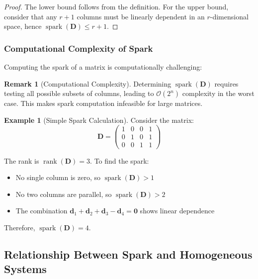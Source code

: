 \documentclass[12pt]{article}
\renewcommand{\vec}[1]{\mathbf{#1}}
\DeclareMathOperator{\spark}{spark}
\DeclareMathOperator{\rank}{rank}
\theoremstyle{definition}
\newtheorem{example}[theorem]{Example}
\newtheorem{remark}[theorem]{Remark}
\begin{document}
\begin{proof}
    The lower bound follows from the definition. For the upper bound, consider that any $r+1$ columns must be linearly dependent in an $r$-dimensional space, hence $\spark(\mathbf{D}) \leq r + 1$.
\end{proof}

\subsubsection{Computational Complexity of Spark}

Computing the spark of a matrix is computationally challenging:

\begin{remark}[Computational Complexity]
    Determining $\spark(\mathbf{D})$ requires testing all possible subsets of columns, leading to $\mathcal{O}(2^n)$ complexity in the worst case. This makes spark computation infeasible for large matrices.
\end{remark}

\begin{example}[Simple Spark Calculation]
    \label{ex:spark_example}
    Consider the matrix:
    \begin{equation}
        \mathbf{D} = \begin{pmatrix}
            1 & 0 & 0 & 1 \\
            0 & 1 & 0 & 1 \\
            0 & 0 & 1 & 1
        \end{pmatrix}
    \end{equation}

    The rank is $\rank(\mathbf{D}) = 3$. To find the spark:
    \begin{itemize}
        \item No single column is zero, so $\spark(\mathbf{D}) > 1$
        \item No two columns are parallel, so $\spark(\mathbf{D}) > 2$
        \item The combination $\vec{d}_1 + \vec{d}_2 + \vec{d}_3 - \vec{d}_4 = \vec{0}$ shows linear dependence
    \end{itemize}
    Therefore, $\spark(\mathbf{D}) = 4$.
\end{example}

\subsection{Relationship Between Spark and Homogeneous Systems}
\end{document}
